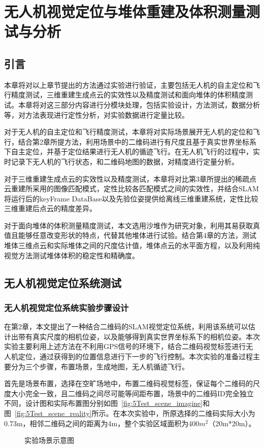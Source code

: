 \chapter{无人机视觉定位与堆体重建及体积测量测试与分析}
\label{cha:chap5}
\section{引言}
\label{sec:5.1}
本章将对以上章节提出的方法通过实验进行验证，主要包括无人机的自主定位和飞行精度测试，三维重建生成点云的实效性以及精度测试和面向堆体的体积精度测试。本章将对这三部分内容进行分模块处理，包括实验设计，方法测试，数据分析等，对方法表现进行定性分析，对实验数据进行定量比较。

对于无人机的自主定位和飞行精度测试，本章将对实际场景展开无人机的定位和飞行，结合第2章所提方法，利用场景中的二维码进行有尺度且基于真实世界坐标系下自主定位，并基于定位结果进行无人机的循迹飞行。在无人机飞行的过程中，实时记录下无人机的飞行状态，和二维码地图的数据，对精度进行定量分析。

对于三维重建生成点云的实效性以及精度测试，本章将对比第3章所提出的稀疏点云重建所采用的图像匹配模式，定性比较各匹配模式之间的实效性，并结合SLAM将运行后的keyFrame DataBase以及先验位姿提供给离线三维重建系统，定性比较三维重建后点云的精度差异。

对于面向堆体的体积测量精度测试，本文选用沙堆作为研究对象，利用其易获取真值且能够任意改变形状的特点，代替其他堆体进行试验。结合第4章的方法，测试堆体三维点云和实际堆体之间的尺度估计值，堆体点云的水平面方程，以及利用纯视觉方法测试堆体体积的稳定性和精确度。
\section{无人机视觉定位系统测试}
\label{sec:5.2}
\subsection{无人机视觉定位系统实验步骤设计}
\label{sec:5.2.1}
在第2章，本文提出了一种结合二维码的SLAM视觉定位系统，利用该系统可以估计出带有真实尺度的相机位姿，以及能够得到真实世界坐标系下的相机位姿。本次实验主要利用上述方法在不利用GPS信号的环境下，结合二维码视觉标签进行无人机定位，通过获得到的位置信息进行下一步的飞行控制。本次实验的准备过程主要分为三个步骤，布置场景，生成地图，无人机循迹飞行。

首先是场景布置，选择在空旷场地中，布置二维码视觉标签，保证每个二维码的尺度大小完全一致，且二维码之间尽可能等间距布置，场景中的二维码ID完全独立不同，设计图和实际布置图分别如图~\ref{fig:5Test_scene_imagine}和图~\ref{fig:5Test_scene_reality}所示。在本次实验中，所原选择的二维码实际大小为0.73m，相邻二维码之间的距离为4m，整个实验区域面积为400$m^2$（20m*20m）。
\begin{figure}[H]
  \centering%
  \hspace{4em}%
  \caption{实验场景示意图}
  \label{fig:scene}
\end{figure}

